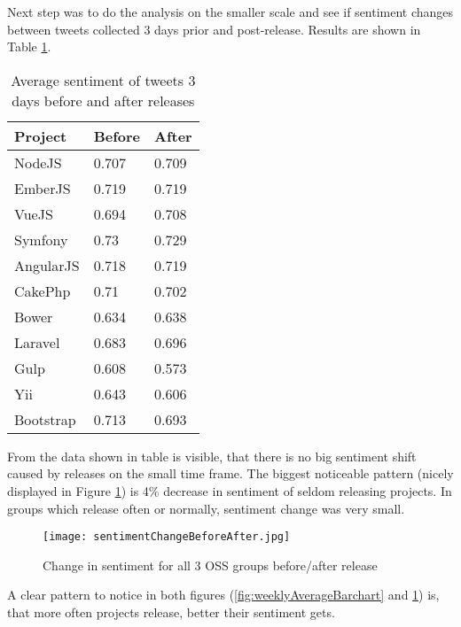 Next step was to do the analysis on the smaller scale and see if sentiment changes between tweets collected 3 days prior and post-release. Results are shown in Table \ref{table:BeforeAfterReleaseSentiment}.

\begin{table}[H]
\centering
\begin{tabular}{ |p{3cm}|p{3cm}|p{3cm}|}
 \hline
\textbf{Project }& \textbf{Before}& \textbf{After}\\
 \hline
 NodeJS   & 0.707 & 0.709\\ \hline
 EmberJS   & 0.719 & 0.719\\ \hline
 VueJS   & 0.694 & 0.708\\ \hline 
 Symfony & 0.73 & 0.729\\ \hline   
 AngularJS   & 0.718 & 0.719\\ \hline
 CakePhp & 0.71 & 0.702\\ \hline 
 Bower   & 0.634 & 0.638\\ \hline 
 Laravel & 0.683 & 0.696\\ \hline
 Gulp & 0.608 & 0.573\\ \hline
 Yii & 0.643 & 0.606\\ \hline
 Bootstrap & 0.713 & 0.693\\ \hline
\end{tabular}
\caption{Average sentiment of tweets 3 days before and after releases}
\label{table:BeforeAfterReleaseSentiment}
\end{table}

From the data shown in table is visible, that there is no big sentiment shift caused by releases on the small time frame. The biggest noticeable pattern (nicely displayed in Figure \ref{fig:sentimentChangeBeforeAfter}) is 4\% decrease in sentiment of seldom releasing projects. In groups which release often or normally, sentiment change was very small.

\begin{figure}[H]%
    \centering
	\texttt{[image: sentimentChangeBeforeAfter.jpg]}
    \caption{Change in sentiment for all 3 OSS groups before/after release}%
    \label{fig:sentimentChangeBeforeAfter}%
\end{figure}

A clear pattern to notice in both figures (\ref{fig:weeklyAverageBarchart} and \ref{fig:sentimentChangeBeforeAfter}) is, that more often projects release, better their sentiment gets.